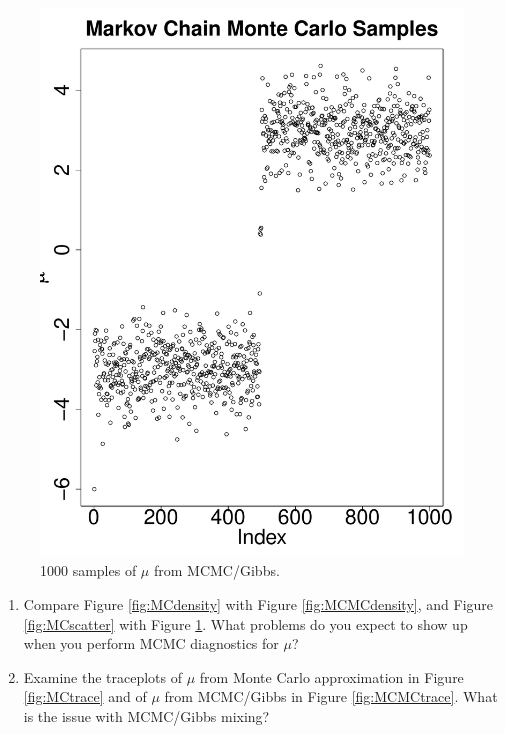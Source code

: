 \documentclass[11pt]{article}
\begin{document}
\begin{enumerate}
\begin{itemize}
\begin{multicols}{2}
\begin{figure}[H]
\begin{center}
\includegraphics[scale=0.3]{figures/MCMCscatter}
\caption{\label{fig:MCMCscatter} 1000 samples of $\mu$ from MCMC/Gibbs.}
\end{center}
\end{figure}

\end{multicols}


\end{itemize}

\begin{enumerate}

\item Compare Figure \ref{fig:MCdensity} with Figure \ref{fig:MCMCdensity}, and Figure \ref{fig:MCscatter} with Figure \ref{fig:MCMCscatter}. What problems do you expect to show up when you perform MCMC diagnostics for $\mu$?

\item Examine the traceplots of $\mu$ from Monte Carlo approximation in Figure \ref{fig:MCtrace} and of $\mu$ from MCMC/Gibbs in Figure \ref{fig:MCMCtrace}. What is the issue with MCMC/Gibbs mixing?


\end{enumerate}
\end{enumerate}
\end{document}
